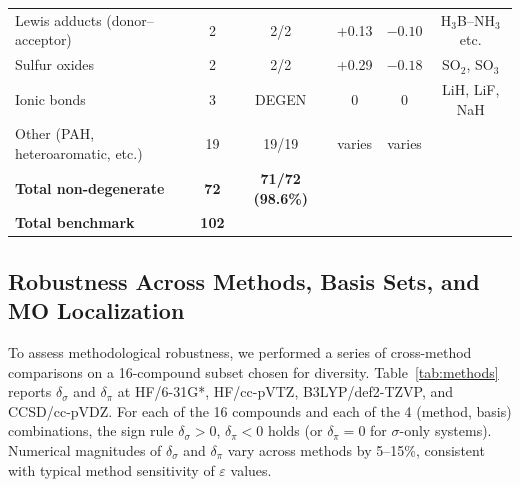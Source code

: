 \documentclass[twoside,natbib]{svjour3}
\newcommand{\delsg}{\delta_{\sigma}}
\newcommand{\delpi}{\delta_{\pi}}
\newcommand{\eps}{\varepsilon}
\begin{document}
\begin{table}[t]
\begin{tabular}{lccccc}
Lewis adducts (donor--acceptor) & 2 & 2/2 & +0.13 & $-0.10$ & H$_3$B--NH$_3$ etc. \\
Sulfur oxides               & 2 & 2/2 & +0.29 & $-0.18$ & SO$_2$, SO$_3$ \\
Ionic bonds                 & 3 & DEGEN & 0 & 0 & LiH, LiF, NaH \\
Other (PAH, heteroaromatic, etc.) & 19 & 19/19 & varies & varies & \\
\midrule
\textbf{Total non-degenerate} & \textbf{72} & \textbf{71/72 (98.6\%)} & & & \\
\textbf{Total benchmark} & \textbf{102} & & & & \\
\bottomrule
\end{tabular}
\end{table}

\subsection{Robustness Across Methods, Basis Sets, and MO Localization}
\label{sec:results_robust}

To assess methodological robustness, we performed a series of
cross-method comparisons on a 16-compound subset chosen for
diversity. Table~\ref{tab:methods} reports $\delsg$ and $\delpi$ at
HF/6-31G*, HF/cc-pVTZ, B3LYP/def2-TZVP, and CCSD/cc-pVDZ. For each
of the 16 compounds and each of the 4 (method, basis) combinations,
the sign rule $\delsg > 0$, $\delpi < 0$ holds (or $\delpi = 0$ for
$\sigma$-only systems). Numerical magnitudes of $\delsg$ and $\delpi$
vary across methods by 5--15\%, consistent with typical method
sensitivity of $\eps$ values.
\end{document}

